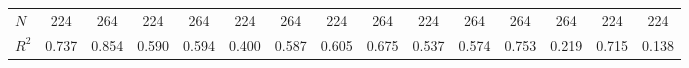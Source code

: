 \begin{table}[htbp]
\begin{tabular}{l*{14}{c}}
\hline
\(N\)       &         224         &         264         &         224         &         264         &         224         &         264         &         224         &         264         &         224         &         264         &         264         &         264         &         224         &         224         \\
\(R^{2}\)   &       0.737         &       0.854         &       0.590         &       0.594         &       0.400         &       0.587         &       0.605         &       0.675         &       0.537         &       0.574         &       0.753         &       0.219         &       0.715         &       0.138         \\
\hline\hline
\end{tabular}
\end{table}
